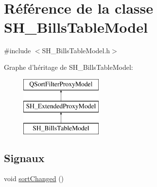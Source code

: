 \hypertarget{classSH__BillsTableModel}{\section{Référence de la classe S\-H\-\_\-\-Bills\-Table\-Model}
\label{classSH__BillsTableModel}
}


{\ttfamily \#include $<$S\-H\-\_\-\-Bills\-Table\-Model.\-h$>$}

Graphe d'héritage de S\-H\-\_\-\-Bills\-Table\-Model\-:\begin{figure}[H]
\begin{center}
\leavevmode
\includegraphics[height=3.000000cm]{classSH__BillsTableModel}
\end{center}
\end{figure}
\subsection*{Signaux}
\begin{DoxyCompactItemize}
\item 
void \hyperlink{classSH__ExtendedProxyModel_ad34f69425d6c86a2671cf9f85562a724}{sort\-Changed} ()
\end{DoxyCompactItemize}
